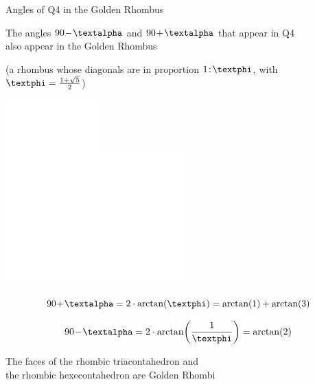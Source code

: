 \documentclass[14pt]{beamer}
\begin{document}
    \begin{frame}{Angles of Q4 in the Golden Rhombus}
        \begin{center}
            The angles $90\!-\!\text{\textalpha}$ and $90\!+\!\text{\textalpha}$ that appear in Q4\\also appear in the Golden Rhombus

            \medskip

            {\footnotesize(a rhombus whose diagonals are in proportion $1\!:\!\text{\textphi}$, with $\text{\textphi} =\tfrac{1+\sqrt{5}}{2}$)}

            \bigskip

            \begin{minipage}{16ex}\vspace{2ex}
                \includegraphics[height=15ex]{figures/figure007a.pdf}\includegraphics[height=15ex]{figures/figure007b.pdf}\\
            \end{minipage}\quad\begin{minipage}{25ex}
                \footnotesize
                $$90\!+\!\text{\textalpha} = 2\cdot\arctan{\!\left(\text{\textphi}\right)} = \arctan{\!\left(1\right)} + \arctan{\!\left(3\right)}$$

                $$90\!-\!\text{\textalpha} = 2\cdot\arctan{\!\left(\frac{1}{\text{\textphi}}\right)} = \arctan{\!\left(2\right)}$$

                \bigskip
            \end{minipage}

            {\footnotesize The faces of the rhombic triacontahedron and\\the rhombic hexecontahedron are Golden Rhombi}
        \end{center}
    \end{frame}

\end{document}
